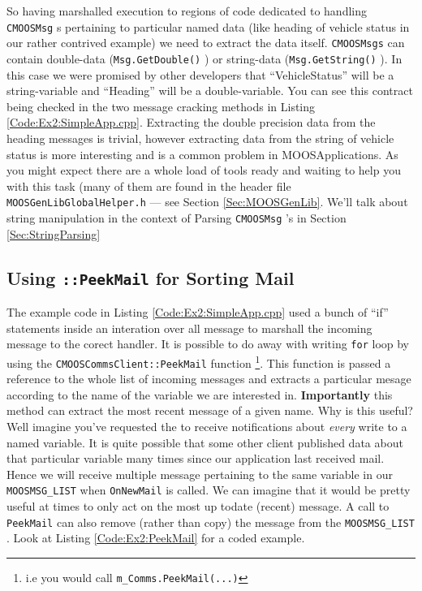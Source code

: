 \documentclass[a4paper,10pt]{article}
\newcommand{\Code}[1]{\texttt{#1} }
\newcommand{\code}[1]{\Code{#1} }
\begin{document}
So having marshalled execution to regions of code dedicated to
handling \code{CMOOSMsg}s pertaining to particular named data
(like heading of vehicle status in our rather contrived example)
we need to extract the data itself. \code{CMOOSMsgs} can contain
double-data (\code{Msg.GetDouble()}) or string-data
(\code{Msg.GetString()}). In this case we were promised by other
developers that ``VehicleStatus'' will be a string-variable and
``Heading'' will be a double-variable. You can see this contract
being checked in the two message cracking methods in Listing
\ref{Code:Ex2:SimpleApp.cpp}. Extracting the double precision data
from the heading messages is trivial, however extracting data from
the string of vehicle status is more interesting and is a common
problem in MOOSApplications. As you might expect there are a whole
load of tools ready and waiting to help you with this task (many
of them are found in the header file
\code{MOOSGenLibGlobalHelper.h} --- see Section
\ref{Sec:MOOSGenLib}. We'll talk about string manipulation in the
context of Parsing \code{CMOOSMsg}'s in Section
\ref{Sec:StringParsing}

\subsection{Using \code{::PeekMail} for Sorting Mail}
The example code in Listing \ref{Code:Ex2:SimpleApp.cpp} used a bunch of ``if'' statements inside an interation over all message to marshall the incoming message to the corect handler. It is possible to do away with writing  \code{for} loop by using the
\code{CMOOSCommsClient::PeekMail} function \footnote{i.e you would call \code{m\_Comms.PeekMail(...)}}. This function is passed a reference to the whole list of incoming messages and extracts a particular mesage according to the name of the variable we are interested in. \textbf{Importantly} this method can extract the most recent message of a given name. Why is this useful? Well imagine you've requested the to receive notifications about \textit{every} write to a named variable. It is quite possible that some other client published data about that particular variable many times since our application last received mail. Hence we will receive multiple message pertaining to the same variable in our \code{MOOSMSG\_LIST} when \code{OnNewMail} is called. We can imagine that it would be pretty useful at times to only act on the most up todate (recent) message. A call to \code{PeekMail} can also remove (rather than copy) the message from the \code{MOOSMSG\_LIST}. Look at Listing \ref{Code:Ex2:PeekMail} for a coded example.
\end{document}
